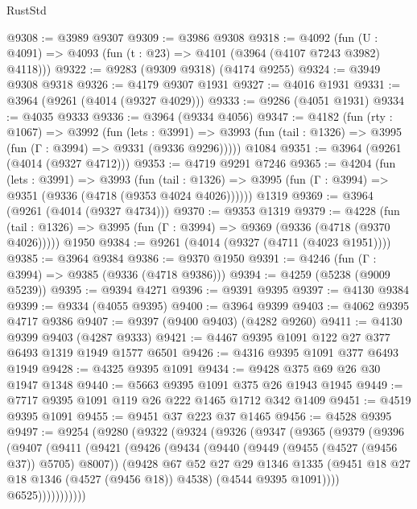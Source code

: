 \begin{lexlean}{RustStd}
\begin{coremodule}
@9308 := @3989 @9307
@9309 := @3986 @9308
@9318 := @4092 (fun (U : @4091) => @4093 (fun (t : @23) => @4101 (@3964 (@4107 @7243 @3982) @4118)))
@9322 := @9283 (@9309 @9318) (@4174 @9255)
@9324 := @3949 @9308 @9318
@9326 := @4179 @9307 @1931
@9327 := @4016 @1931
@9331 := @3964 (@9261 (@4014 (@9327 @4029)))
@9333 := @9286 (@4051 @1931)
@9334 := @4035 @9333
@9336 := @3964 (@9334 @4056)
@9347 := @4182
    (fun (rty : @1067) =>
    @3992
      (fun (lets : @3991) =>
      @3993 (fun (tail : @1326) => @3995 (fun (Γ : @3994) => @9331 (@9336 @9296)))))
    @1084
@9351 := @3964 (@9261 (@4014 (@9327 @4712)))
@9353 := @4719 @9291 @7246
@9365 := @4204
    (fun (lets : @3991) =>
    @3993
      (fun (tail : @1326) => @3995 (fun (Γ : @3994) => @9351 (@9336 (@4718 (@9353 @4024 @4026))))))
    @1319
@9369 := @3964 (@9261 (@4014 (@9327 @4734)))
@9370 := @9353 @1319
@9379 := @4228
    (fun (tail : @1326) => @3995 (fun (Γ : @3994) => @9369 (@9336 (@4718 (@9370 @4026)))))
    @1950
@9384 := @9261 (@4014 (@9327 (@4711 (@4023 @1951))))
@9385 := @3964 @9384
@9386 := @9370 @1950
@9391 := @4246 (fun (Γ : @3994) => @9385 (@9336 (@4718 @9386)))
@9394 := @4259 (@5238 (@9009 @5239))
@9395 := @9394 @4271
@9396 := @9391 @9395
@9397 := @4130 @9384
@9399 := @9334 (@4055 @9395)
@9400 := @3964 @9399
@9403 := @4062 @9395 @4717 @9386
@9407 := @9397 (@9400 @9403) (@4282 @9260)
@9411 := @4130 @9399 @9403 (@4287 @9333)
@9421 := @4467 @9395 @1091 @122 @27 @377 @6493 @1319 @1949 @1577 @6501
@9426 := @4316 @9395 @1091 @377 @6493 @1949
@9428 := @4325 @9395 @1091
@9434 := @9428 @375 @69 @26 @30 @1947 @1348
@9440 := @5663 @9395 @1091 @375 @26 @1943 @1945
@9449 := @7717 @9395 @1091 @119 @26 @222 @1465 @1712 @342 @1409
@9451 := @4519 @9395 @1091
@9455 := @9451 @37 @223 @37 @1465
@9456 := @4528 @9395
@9497 := @9254
    (@9280
      (@9322
        (@9324
          (@9326
            (@9347
              (@9365
                (@9379
                  (@9396
                    (@9407
                      (@9411
                        (@9421
                          (@9426
                            (@9434
                              (@9440 (@9449 (@9455 (@4527 (@9456 @37)) @5705) @8007))
                              (@9428
                                @67
                                @52
                                @27
                                @29
                                @1346
                                @1335
                                (@9451 @18 @27 @18 @1346 (@4527 (@9456 @18)) @4538)
                                (@4544 @9395 @1091))))
                          @6525)))))))))))

\end{coremodule}
\end{lexlean}
